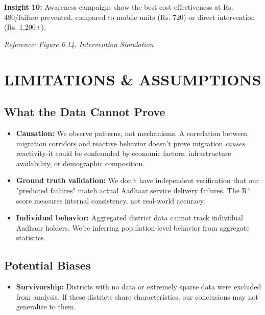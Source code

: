 \documentclass[11pt, a4paper]{article}
\begin{document}
\textbf{Insight 10:} Awareness campaigns show the best cost-effectiveness at Rs. 480/\allowbreak failure prevented, compared to mobile units (Rs. 720) or direct intervention (Rs. 1,200+).

\textit{Reference: Figure 6.14, Intervention Simulation}




\section{LIMITATIONS \& ASSUMPTIONS}

\subsection{What the Data Cannot Prove}

\begin{itemize}
\item \textbf{Causation:} We observe patterns, not mechanisms. A correlation between migration corridors and reactive behavior doesn't prove migration \textit{causes} reactivity-it could be confounded by economic factors, infrastructure availability, or demographic composition.
\end{itemize}

\begin{itemize}
\item \textbf{Ground truth validation:} We don't have independent verification that our "predicted failures" match actual Aadhaar service delivery failures. The R² score measures internal consistency, not real-world accuracy.
\end{itemize}

\begin{itemize}
\item \textbf{Individual behavior:} Aggregated district data cannot track individual Aadhaar holders. We're inferring population-level behavior from aggregate statistics.
\end{itemize}

\subsection{Potential Biases}

\begin{itemize}
\item \textbf{Survivorship:} Districts with no data or extremely sparse data were excluded from analysis. If these districts share characteristics, our conclusions may not generalize to them.
\end{itemize}
\end{document}
